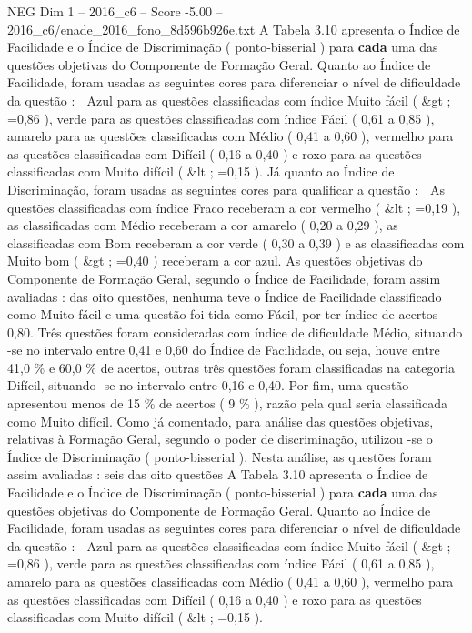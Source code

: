 \begin{textsample}{NEG Dim 1 – 2016\_c6 – Score -5.00 – 2016\_c6/enade\_2016\_fono\_8d596b926e.txt}
A Tabela 3.10 apresenta o Índice de Facilidade e o Índice de Discriminação ( ponto-bisserial ) para \textbf{cada} uma das questões objetivas do Componente de Formação Geral.
Quanto ao Índice de Facilidade, foram usadas as seguintes cores para diferenciar o nível de dificuldade da questão :  Azul para as questões classificadas com índice Muito fácil ( \&gt ; =0,86 ), verde para as questões classificadas com índice Fácil ( 0,61 a 0,85 ), amarelo para as questões classificadas com Médio ( 0,41 a 0,60 ), vermelho para as questões classificadas com Difícil ( 0,16 a 0,40 ) e roxo para as questões classificadas com Muito difícil ( \&lt ; =0,15 ).
Já quanto ao Índice de Discriminação, foram usadas as seguintes cores para qualificar a questão :  As questões classificadas com índice Fraco receberam a cor vermelho ( \&lt ; =0,19 ), as classificadas com Médio receberam a cor amarelo ( 0,20 a 0,29 ), as classificadas com Bom receberam a cor verde ( 0,30 a 0,39 ) e as classificadas com Muito bom ( \&gt ; =0,40 ) receberam a cor azul.
As questões objetivas do Componente de Formação Geral, segundo o Índice de Facilidade, foram assim avaliadas : das oito questões, nenhuma teve o Índice de Facilidade classificado como Muito fácil e uma questão foi tida como Fácil, por ter índice de acertos 0,80.
Três questões foram consideradas com índice de dificuldade Médio, situando -se no intervalo entre 0,41 e 0,60 do Índice de Facilidade, ou seja, houve entre 41,0 \% e 60,0 \% de acertos, outras três questões foram classificadas na categoria Difícil, situando -se no intervalo entre 0,16 e 0,40.
Por fim, uma questão apresentou menos de 15 \% de acertos ( 9 \% ), razão pela qual seria classificada como Muito difícil.
Como já comentado, para análise das questões objetivas, relativas à Formação Geral, segundo o poder de discriminação, utilizou -se o Índice de Discriminação ( ponto-bisserial ).
Nesta análise, as questões foram assim avaliadas : seis das oito questões A Tabela 3.10 apresenta o Índice de Facilidade e o Índice de Discriminação ( ponto-bisserial ) para \textbf{cada} uma das questões objetivas do Componente de Formação Geral.
Quanto ao Índice de Facilidade, foram usadas as seguintes cores para diferenciar o nível de dificuldade da questão :  Azul para as questões classificadas com índice Muito fácil ( \&gt ; =0,86 ), verde para as questões classificadas com índice Fácil ( 0,61 a 0,85 ), amarelo para as questões classificadas com Médio ( 0,41 a 0,60 ), vermelho para as questões classificadas com Difícil ( 0,16 a 0,40 ) e roxo para as questões classificadas com Muito difícil ( \&lt ; =0,15 ).

\end{textsample}
